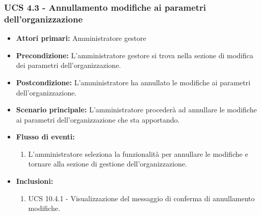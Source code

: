 \subsubsection{UCS 4.3 - Annullamento modifiche ai parametri dell'organizzazione}%
\begin{itemize}
\item \textbf{Attori primari:} Amministratore gestore
\item \textbf{Precondizione:} L'amministratore gestore si trova nella sezione di modifica dei parametri dell'organizzazione.
\item \textbf{Postcondizione:} L'amministratore ha annullato le modifiche ai parametri dell'organizzazione.
\item \textbf{Scenario principale:} L'amministratore procederà ad annullare le modifiche ai parametri dell'organizzazione che sta apportando.
\item \textbf{Flusso di eventi:}
\begin{enumerate}
    \item L'amministratore seleziona la funzionalità per annullare le modifiche e tornare alla sezione di gestione dell'organizzazione.
\end{enumerate}
\item \textbf{Inclusioni:}
\begin{enumerate}
    \item UCS 10.4.1 - Visualizzazione del messaggio di conferma di annullamento modifiche.
\end{enumerate}
\end{itemize}